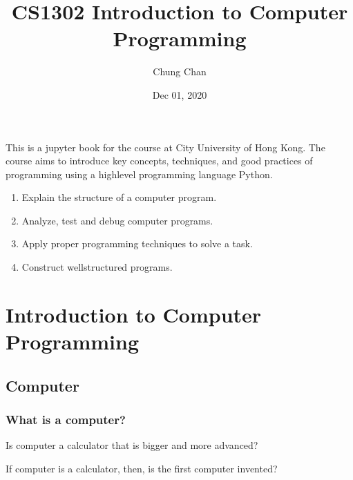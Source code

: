 \documentclass[letterpaper,10pt,english]{sphinxmanual}
\title{CS1302 Introduction to Computer Programming}
\date{Dec 01, 2020}
\author{Chung Chan}
\begin{document}
\pagestyle{empty}
\sphinxmaketitle
\pagestyle{plain}
\sphinxtableofcontents
\pagestyle{normal}
\label{\detokenize{README::doc}}


This is a jupyter book for the course  at City University of Hong Kong.
The course aims to introduce key concepts, techniques, and good practices of programming using a high\sphinxhyphen{}level programming language Python.

\begin{enumerate}
%
\item {} 
Explain the structure of a computer program.

\item {} 
Analyze, test and debug computer programs.

\item {} 
Apply proper programming techniques to solve a task.

\item {} 
Construct well\sphinxhyphen{}structured programs.

\end{enumerate}


\chapter{Introduction to Computer Programming}
\label{\detokenize{Lecture1/Introduction to Computer Programming:introduction-to-computer-programming}}\label{\detokenize{Lecture1/Introduction to Computer Programming::doc}}

\section{Computer}
\label{\detokenize{Lecture1/Introduction to Computer Programming:computer}}

\subsection{What is a computer?}
\label{\detokenize{Lecture1/Introduction to Computer Programming:what-is-a-computer}}
Is computer a calculator that is bigger and more advanced?



If computer is a calculator, then, is  the first computer invented?
\end{document}
